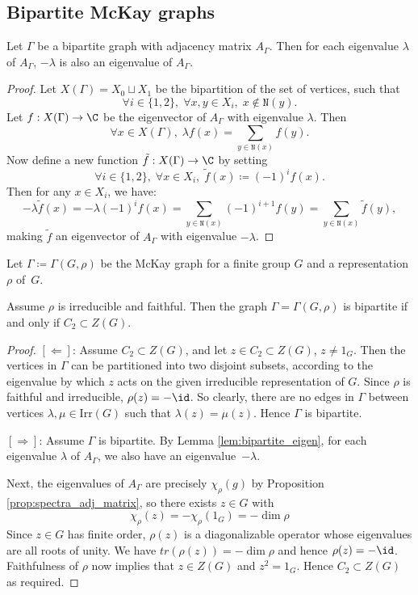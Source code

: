 \subsection{Bipartite McKay graphs}
\begin{lemma}\label{lem:bipartite_eigen}
 Let $\Gamma$ be a bipartite graph with adjacency matrix $A_{\Gamma}$. Then for each eigenvalue $\lambda$ of $A_{\Gamma}$, $-\lambda$ is also an eigenvalue of $A_{\Gamma}$.
\end{lemma}
\begin{proof}
 Let $X(\Gamma) = X_0 \sqcup X_1$ be the bipartition of the set of vertices, such that $$\forall i\in \{1,2\}, \; \forall x, y \in X_i, \; x\notin \mathtt{N}(y).$$ Let $f: X(\Gamma) \to \C$ be the eigenvector of $A_{\Gamma}$ with eigenvalue $\lambda$. Then $$\forall x\in X(\Gamma), \; \lambda f(x) = \sum_{y \in \mathtt{N}(x)} f(y).$$ Now define a new function $\tilde{f}: X(\Gamma) \to \C$ by setting $$\forall i\in \{1,2\}, \; \forall x\in X_i, \; \tilde{f}(x) \coloneqq  (-1)^i f(x).$$ Then for any $x\in X_i$, we have: 
 $$-\lambda \tilde{f}(x) = -\lambda (-1)^i f(x) = \sum_{y \in \mathtt{N}(x)}(-1)^{i+1} f(y) =  \sum_{y \in \mathtt{N}(x)} \tilde{f}(y),$$ making $\tilde{f}$ an eigenvector of $A_{\Gamma}$ with eigenvalue $-\lambda$.
\end{proof}

Let $\Gamma \coloneqq  \Gamma(G, \rho)$ be the McKay graph for a finite group $G$ and a representation $\rho$ of~$G$.
\begin{lemma}\label{lem:bipartite_center}

 Assume $\rho$ is irreducible and faithful. Then the graph $\Gamma= \Gamma(G, \rho)$ is bipartite if and only if $C_2 \subset Z(G)$. 
\end{lemma}

\begin{proof}

$[\mathbf{\Leftarrow}]$: Assume $C_2 \subset Z(G)$, and let $z\in C_2\subset Z(G)$, $z\neq 1_G $. Then the vertices in $\Gamma$ can be partitioned into two disjoint subsets, according to the eigenvalue by which $z$ acts on the given irreducible representation of $G$. Since $\rho$ is faithful and irreducible, $\rho(z) =-\id$. So clearly, there are no edges in $\Gamma$ between vertices $\lambda, \mu \in \mathrm{Irr}(G)$ such that $\lambda(z) = \mu(z)$. Hence $\Gamma$ is bipartite.

 $[\mathbf{\Rightarrow}]$: Assume $\Gamma$ is bipartite. By Lemma \ref{lem:bipartite_eigen}, for each eigenvalue $\lambda$ of $A_{\Gamma}$, we also have an eigenvalue~$-\lambda$.  
 
 
 Next, the eigenvalues of $A_{\Gamma}$ are precisely $\chi_\rho(g)$ by Proposition \ref{prop:spectra_adj_matrix}, so there exists $z \in G$ with 
 $$\chi_\rho(z) = -\chi_{\rho}(1_G) = - \dim \rho$$
 Since $z \in G$ has finite order, $\rho(z)$ is a diagonalizable operator whose eigenvalues are all roots of unity. We have $tr(\rho(z)) = - \dim \rho$ and hence $\rho(z) = -\id$. Faithfulness of $\rho$ now implies that $z \in Z(G)$ and $z^2 = 1_G$. Hence $C_2 \subset Z(G)$ as required.
 
\end{proof}

